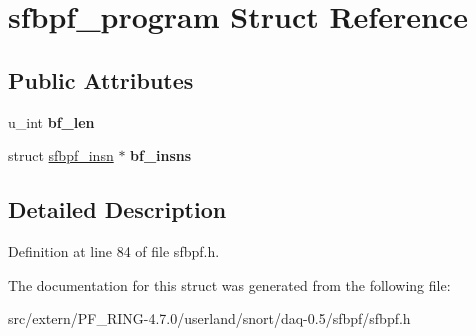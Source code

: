 \hypertarget{structsfbpf__program}{
\section{sfbpf\_\-program Struct Reference}
\label{structsfbpf__program}
}
\subsection*{Public Attributes}
\begin{DoxyCompactItemize}
\item 
\hypertarget{structsfbpf__program_a4d31048491501893e658a77c041a5a59}{
u\_\-int {\bfseries bf\_\-len}}
\label{structsfbpf__program_a4d31048491501893e658a77c041a5a59}

\item 
\hypertarget{structsfbpf__program_a831209b531e2f6870bf84b94566484cb}{
struct \hyperlink{structsfbpf__insn}{sfbpf\_\-insn} $\ast$ {\bfseries bf\_\-insns}}
\label{structsfbpf__program_a831209b531e2f6870bf84b94566484cb}

\end{DoxyCompactItemize}


\subsection{Detailed Description}


Definition at line 84 of file sfbpf.h.



The documentation for this struct was generated from the following file:\begin{DoxyCompactItemize}
\item 
src/extern/PF\_\-RING-\/4.7.0/userland/snort/daq-\/0.5/sfbpf/sfbpf.h\end{DoxyCompactItemize}
